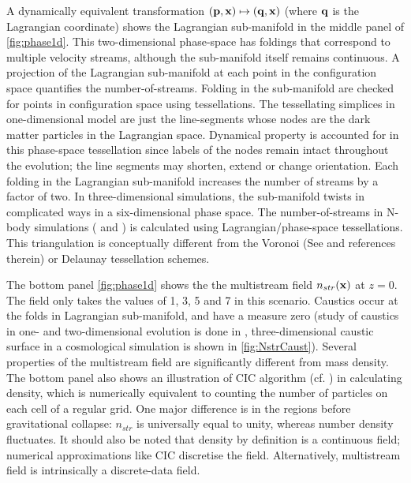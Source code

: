  
A dynamically equivalent transformation $(\bf{p}, \bf{x}) \mapsto (\bf{q}, \bf{x}) $ (where $\bf{q}$ is the Lagrangian coordinate) shows the Lagrangian sub-manifold in the middle panel of \autoref{fig:phase1d}. This two-dimensional phase-space has foldings that correspond to multiple velocity streams, although the sub-manifold itself remains continuous. A projection of the Lagrangian sub-manifold at each point in the configuration space quantifies the number-of-streams. Folding in the sub-manifold are checked for points in configuration space using tessellations. The tessellating simplices in one-dimensional model are just the line-segments whose nodes are the dark matter particles in the Lagrangian space. Dynamical property is accounted for in this phase-space tessellation since labels of the nodes remain intact throughout the evolution; the line segments may shorten, extend or change orientation. Each folding in the Lagrangian sub-manifold increases the number of streams by a factor of two. In three-dimensional simulations, the sub-manifold twists in complicated ways in a six-dimensional phase space. The number-of-streams in N-body simulations (\citealt{Shandarin2012} and \citealt{Abel2012b}) is calculated using Lagrangian/phase-space tessellations. This triangulation is conceptually different from the Voronoi (See \citealt{Schaap2000} and references therein) or Delaunay \citep{Icke1991} tessellation schemes. 

The bottom panel \autoref{fig:phase1d} shows the the multistream field $n_{str}(\bf{x})$ at $z = 0$. The field only takes the values of 1, 3, 5 and 7 in this scenario. Caustics occur at the folds in Lagrangian sub-manifold, and have a measure zero (study of caustics in one- and  two-dimensional evolution is done in \cite{Hidding2014}, three-dimensional caustic surface in a cosmological simulation is shown in \autoref{fig:NstrCaust}). Several properties of the multistream field are significantly different from mass density. The bottom panel also shows an illustration of CIC algorithm (cf. \citealt{Hockney1988}) in calculating density, which is numerically equivalent to counting the number of particles on each cell of a regular grid. One major difference is in the regions before gravitational collapse: $n_{str}$ is universally equal to unity, whereas number density fluctuates. It should also be noted that density by definition is a continuous field; numerical approximations like CIC discretise the field. Alternatively, multistream field is intrinsically a discrete-data field.  


